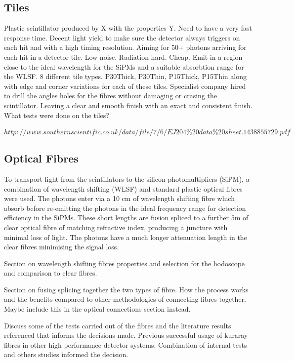 \subsection{Tiles}
Plastic scintillator produced by X with the properties Y.
Need to have a very fast response time.
Decent light yield to make sure the detector always triggers on each hit and with a high timing resolution. Aiming for 50+ photons arriving for each hit in a detector tile.
Low noise.
Radiation hard.
Cheap.
Emit in a region close to the ideal wavelength for the SiPMs and a suitable absorbtion range for the WLSF.
8 different tile types. P30Thick, P30Thin, P15Thick, P15Thin along with edge and corner variations for each of these tiles.
Specialist company hired to drill the angles holes for the fibres without damaging or crasing the scintillator. Leaving a clear and smooth finish with an exact and consistent finish.
What tests were done on the tiles?


$http://www.southernscientific.co.uk/data/file/7/6/EJ204\%20data\%20sheet.1438855729.pdf$

\cite{jacosalem2007systematic}

\subsection{Optical Fibres}

To transport light from the scintillators to the silicon photomultipliers (SiPM), a combination of wavelength shifting (WLSF) and standard plastic optical fibres were used. The photons enter via a 10 cm of wavelength shifting fibre which absorb before re-emitting the photons in the ideal frequency range for detection efficiency in the SiPMs. These short lengths are fusion spliced to a further 5m of clear optical fibre of matching refractive index, producing a juncture with minimal loss of light. The photons have a much longer attenuation length in the clear fibres minimising the signal loss.

Section on wavelength shifting fibres properties and selection for the hodoscope and comparison to clear fibres.

Section on fusing splicing together the two types of fibre. How the process works and the benefits compared to other methodologies of connecting fibres together. Maybe include this in the optical connections section instead.

Discuss some of the tests carried out of the fibres and the literature results referenced that informs the decisions made. Previous successful usage of kuraray fibres in other high performance detector systems. Combination of internal tests and others studies informed the decision.


